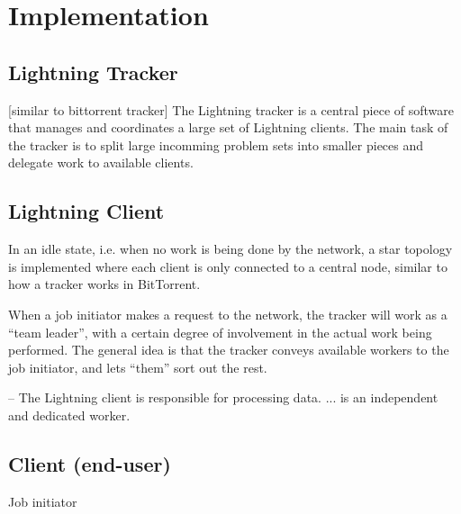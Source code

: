\chapter{Implementation}
 
\section{Lightning Tracker}
[similar to bittorrent tracker]
The Lightning tracker is a central piece of software that manages and coordinates a large set
of Lightning clients. The main task of the tracker is to split large incomming problem sets into smaller pieces and delegate work to available clients.

\section{Lightning Client}
In an idle state, i.e. when no work is being done by the network, a star topology is implemented where each client is only connected to a central node, similar to how a tracker works in BitTorrent.

When a job initiator makes a request to the network, the tracker will work as a “team leader”,  with a certain degree of involvement in the actual work being performed. The general idea is that the tracker conveys available workers to the job initiator, and lets “them” sort out the rest.

--
The Lightning client is responsible for processing data. 
... is an independent and dedicated worker. 

\section{Client (end-user)}
Job initiator